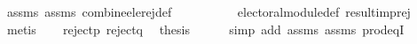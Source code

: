\begin{isabellebody}
\ assms{\isacharparenleft}{\kern0pt}{}{\isacharparenright}{\kern0pt}\ assms{\isacharparenleft}{\kern0pt}{}{\isacharparenright}{\kern0pt}\ combine{\isacharunderscore}{\kern0pt}ele{\isacharunderscore}{\kern0pt}rej{\isacharunderscore}{\kern0pt}def\isanewline
\ \ \ \ \ \ \ \ \ \ electoral{\isacharunderscore}{\kern0pt}module{\isacharunderscore}{\kern0pt}def\ result{\isacharunderscore}{\kern0pt}imp{\isacharunderscore}{\kern0pt}rej\isanewline
\ \ \ \ \isamarkupfalse%
\ metis\isanewline
\ \ \isamarkupfalse%
\ reject{\isacharunderscore}{\kern0pt}p\ reject{\isacharunderscore}{\kern0pt}q\ \isamarkupfalse%
\ {\isacharquery}{\kern0pt}thesis\isanewline
\ \ \ \ \isamarkupfalse%
\ {\isacharparenleft}{\kern0pt}simp\ add{\isacharcolon}{\kern0pt}\ assms{\isacharparenleft}{\kern0pt}{}{\isacharparenright}{\kern0pt}\ assms{\isacharparenleft}{\kern0pt}{}{\isacharparenright}{\kern0pt}\ prod{\isacharunderscore}{\kern0pt}eqI{\isacharparenright}{\kern0pt}\isanewline
{}\isamarkupfalse%
%
\endisatagproof
{\isafoldproof}%
%
\isadelimproof
\isanewline
%
\endisadelimproof
%
\isadelimtheory
\isanewline
%
\endisadelimtheory
%
\isatagtheory
{}\isamarkupfalse%
%
\endisatagtheory
{\isafoldtheory}%
%
\isadelimtheory
%
\endisadelimtheory
%
\end{isabellebody}%
\endinput
